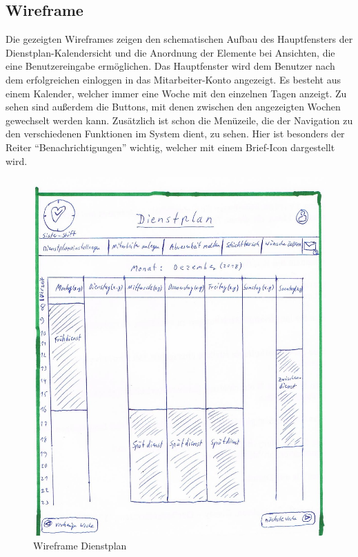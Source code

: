 \documentclass[11pt,
paper=a4,
bibtotocnumbered,	  %
liststotocnumbered,  %
DIV=calc,		  %
tablecaptionabove,	  %
headinclude,
]{article}
\begin{document}
\subsection{Wireframe}
Die gezeigten Wireframes zeigen den schematischen Aufbau des Hauptfensters der Dienstplan-Kalendersicht und die Anordnung der Elemente bei Ansichten, die eine Benutzereingabe ermöglichen. Das Hauptfenster wird dem Benutzer nach dem erfolgreichen einloggen in das Mitarbeiter-Konto angezeigt. Es besteht aus einem Kalender, welcher immer eine Woche mit den einzelnen Tagen anzeigt. Zu sehen sind außerdem die Buttons, mit denen zwischen den angezeigten Wochen gewechselt werden kann. Zusätzlich ist schon die Menüzeile, die der Navigation zu den verschiedenen Funktionen im System dient, zu sehen. Hier ist besonders der Reiter “Benachrichtigungen” wichtig, welcher mit einem Brief-Icon dargestellt wird.
\begin{figure}[H]
\includegraphics[scale=1]{Bilder/Wireframe.jpg}
\caption{Wireframe Dienstplan}
\end{figure}
\end{document}
